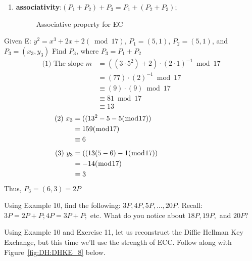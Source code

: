 \begin{enumerate}[1.]
\item \textbf{associativity}:$(P_1 + P_2) + P_3 = P_1 + (P_2 + P_3)$;
\begin{figure}[H]
	  \caption{\label{fig:DH:DHKE_12} Associative property for EC}
\end{figure}
\end{enumerate}

\begin{eg} Given E: $y^2 = x^3 + 2x + 2 (\bmod17)$, $P_1 = (5,1)$, $P_2 = (5,1)$, and $P_3 = (x_3, y_3)$
	Find $P_3$, where $P_3 = P_1 + P_2$
		\begin{align*}
		\textrm{(1) The slope~} m
		 &= ( (3 \cdot 5^2) + 2) \cdot (2 \cdot 1)^{-1} \bmod 17\\
	          &= (77) \cdot (2)^{-1} \bmod 17\\
                     &\equiv (9) \cdot (9) \bmod 17\\
                     &\equiv 81 \bmod 17\\
                    &\equiv 13
		\end{align*}
		\begin{align*}
		\textrm{(2)~}x_3
		 &= ( (13^2 - 5 - 5  (\bmod 17)) \text{\qquad \qquad \qquad \quad \: \: }\\
	          &= 159(\bmod 17)\\
                     &\equiv 6
		\end{align*}
			\begin{align*}
		\textrm{(3)~}y_3
		 &= ( (13(5 - 6) - 1(\bmod 17)) \text{\qquad \qquad \qquad \quad }\\
	          &= -14(\bmod 17)\\
                     &\equiv 3
		\end{align*}
Thus, $P_3 = (6,3) = 2P$
\end{eg}
\begin {exer}
Using Example 10, find the following: $3P, 4P, 5P, ..., 20P.$  Recall: $3P = 2P + P;  4P = 3P +P;$ etc.  What do you notice about $18P,  19P,$ and $20P?$
\end{exer}
Using Example 10 and Exercise 11, let us reconstruct the Diffie Hellman Key Exchange, but this time we'll use the strength of ECC.  Follow along with Figure~\ref{fig:DH:DHKE_8} below.

